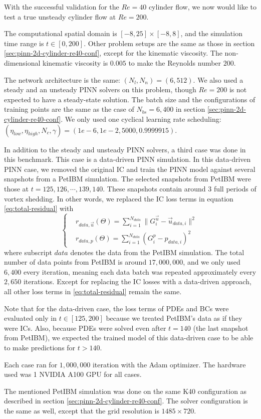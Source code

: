 With the successful validation for the $Re=40$ cylinder flow, we now would like to test a true unsteady cylinder flow at $Re=200$.

The computational spatial domain is $[-8, 25]\times[-8, 8]$, and the simulation time range is $t\in[0, 200]$.
Other problem setups are the same as those in section \ref{sec:pinn-2d-cylinder-re40-conf}, except for the kinematic viscosity.
The non-dimensional kinematic viscosity is $0.005$ to make the Reynolds number $200$.

The network architecture is the same: $(N_l, N_n)=(6, 512)$.
We also used a steady and an unsteady PINN solvers on this problem, though $Re=200$ is not expected to have a steady-state solution.
The batch size and the configurations of training points are the same as the case of $N_{bs}=6,400$ in section \ref{sec:pinn-2d-cylinder-re40-conf}.
We only used one cyclical learning rate scheduling: $(\eta_{low}, \eta_{high}, N_c, \gamma)=(1e-6, 1e-2, 5000, 0.9999915)$.

In addition to the steady and unsteady PINN solvers, a third case was done in this benchmark.
This case is a data-driven PINN simulation.
In this data-driven PINN case, we removed the original IC and train the PINN model against several snapshots from a PetIBM simulation.
The selected snapshots from PetIBM were those at $t=125,126,\cdots,139, 140$.
These snapshots contain around $3$ full periods of vortex shedding.
In other words, we replaced the IC loss terms in equation \eqref{eq:total-residual} with  
\begin{equation}\label{eq:data-driven-loss}
    \left\{
        \begin{aligned}
            &r_{data,\vec{u}}(\Theta) = \sum\limits_{i=1}^{N_{data}}\lVert G_i^{\vec{u}} - \vec{u}_{data, i}\rVert^2 \\
            &r_{data,p}(\Theta) = \sum\limits_{i=1}^{N_{data}}\left( G_i^{p} - p_{data, i} \right)^2
        \end{aligned}
    \right.
\end{equation}
where subscript $data$ denotes the data from the PetIBM simulation.
The total number of data points from PetIBM is around $17,000,000$, and we only used $6,400$ every iteration, meaning each data batch was repeated approximately every $2,650$ iterations.
Except for replacing the IC losses with a data-driven approach, all other loss terms in \eqref{eq:total-residual} remain the same.

Note that for the data-driven case, the loss terms of PDEs and BCs were evaluated only in $t\in[125, 200]$ because we treated PetIBM's data as if they were ICs.
Also, because PDEs were solved even after $t=140$ (the last snapshot from PetIBM), we expected the trained model of this data-driven case to be able to make predictions for $t>140$.

Each case ran for $1,000,000$ iteration with the Adam optimizer.
The hardware used was 1 NVIDIA A100 GPU for all cases.

The mentioned PetIBM simulation was done on the same K40 configuration as described in section \ref{sec:pinn-2d-cylinder-re40-conf}.
The solver configuration is the same as well, except that the grid resolution is $1485\times 720$.
